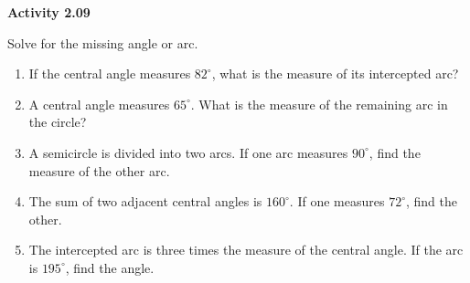 \vspace{0.3ex}
\noindent\textbf{Activity 2.09}

\vspace{0.2ex}

Solve for the missing angle or arc.

\begin{enumerate}
    \item If the central angle measures $82^\circ$, what is the measure of its intercepted arc?
    \item A central angle measures $65^\circ$. What is the measure of the remaining arc in the circle?
    \item A semicircle is divided into two arcs. If one arc measures $90^\circ$, find the measure of the other arc.
    \item The sum of two adjacent central angles is $160^\circ$. If one measures $72^\circ$, find the other.
    \item The intercepted arc is three times the measure of the central angle. If the arc is $195^\circ$, find the angle.
\end{enumerate}
